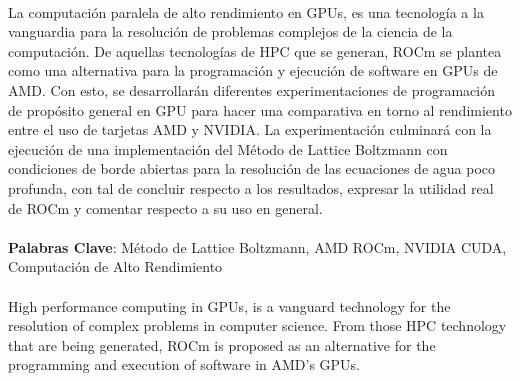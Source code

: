 \
\vfill
\vfill
\begin{flushright}
\end{flushright}
\begin{flushright}
\noindent \dedicatoria
\end{flushright}
\vfill
\fi
\newpage
\setcounter{page}{2}
\begin{center}
\end{center}
\noindent \agradecimientos
\vfill
\newpage
{}
\vspace{0.3cm}
\noindent La computación paralela de alto rendimiento en GPUs, es una tecnología a la vanguardia para la resolución de problemas complejos de la ciencia de la computación.
De aquellas tecnologías de HPC que se generan, ROCm se plantea como una alternativa para la programación y ejecución de software en GPUs de AMD.
Con esto, se desarrollarán diferentes experimentaciones de programación de propósito general en GPU para hacer una comparativa en torno al rendimiento entre el uso de tarjetas AMD y NVIDIA.
La experimentación culminará con la ejecución de una implementación del Método de Lattice Boltzmann con condiciones de borde abiertas para la resolución de las ecuaciones de agua poco profunda, con tal de concluir respecto a los resultados, expresar la utilidad real de ROCm y comentar respecto a su uso en general. \ \\
\vspace{0.3cm} \\
\noindent \textbf{Palabras Clave}: Método de Lattice Boltzmann, AMD ROCm, NVIDIA CUDA, Computación de Alto Rendimiento  \ \\
\vspace{1.2cm} \\
\vspace{0.3cm}
\noindent High performance computing in GPUs, is a vanguard technology for the resolution of complex problems in computer science. 
From those HPC technology that are being generated, ROCm is proposed as an alternative for the programming and execution of software in AMD's GPUs.
